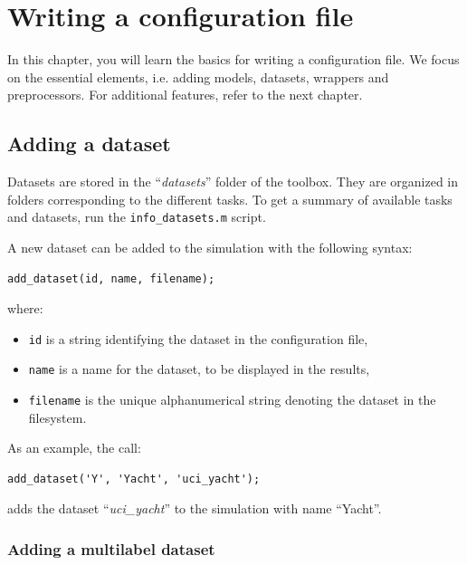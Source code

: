 \chapter{Writing a configuration file}
\label{chap:writingconfig}

In this chapter, you will learn the basics for writing a configuration file. We focus on the essential elements, i.e. adding models, datasets, wrappers and preprocessors. For additional features, refer to the next chapter.

\section{Adding a dataset}

Datasets are stored in the ``\textit{datasets}'' folder of the toolbox. They are organized in folders corresponding to the different tasks. To get a summary of available tasks and datasets, run the \verb|info_datasets.m| script.

A new dataset can be added to the simulation with the following syntax:

\begin{small}
\begin{verbatim}
add_dataset(id, name, filename);
\end{verbatim}
\end{small}

\noindent where:

\begin{itemize}
\item \verb|id| is a string identifying the dataset in the configuration file,
\item \verb|name| is a name for the dataset, to be displayed in the results,
\item \verb|filename| is the unique alphanumerical string denoting the dataset in the filesystem.
\end{itemize}

\noindent As an example, the call:

\begin{lstlisting}
add_dataset('Y', 'Yacht', 'uci_yacht');
\end{lstlisting}

\noindent adds the dataset ``\textit{uci\_yacht}'' to the simulation with name ``Yacht''.

\subsection{Adding a multilabel dataset}
\label{sec:multilabeldataset}

